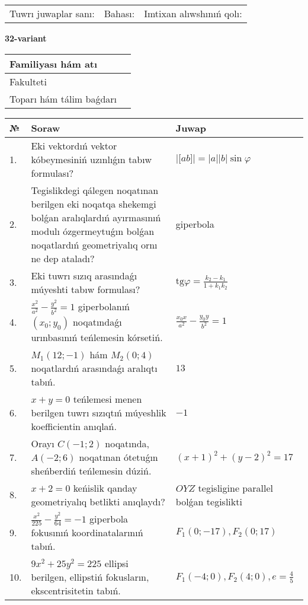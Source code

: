 \documentclass{article}
\begin{document}
\vspace{1cm}

\begin{tabular}{lll}
Tuwrı juwaplar sanı: \underline{\hspace{1.5cm}} & 
Bahası: \underline{\hspace{1.5cm}} & 
Imtixan alıwshınıń qolı: \underline{\hspace{2cm}} \\
\end{tabular}

\egroup

\newpage


\textbf{32-variant}\\

\bgroup
\def\arraystretch{1.6} %

\begin{tabular}{|m{5.7cm}|m{9.5cm}|}
\hline
Familiyası hám atı & \\
\hline
Fakulteti  & \\
\hline
Toparı hám tálim baǵdarı  & \\
\hline
\end{tabular}

\vspace{1cm}

\begin{tabular}{|m{0.7cm}|m{10cm}|m{4cm}|}
\hline
№ & Soraw & Juwap \\
\hline
1. & Eki vektordıń vektor kóbeymesiniń uzınlıǵın tabıw formulası? & $\left| \lbrack ab\rbrack \right|=|a||b|\sin\varphi$ \\
\hline
2. & Tegislikdegi qálegen noqatınan berilgen eki noqatqa shekemgi bolǵan aralıqlardıń ayırmasınıń modulı ózgermeytuǵın bolǵan noqatlardıń geometriyalıq ornı ne dep ataladı? & giperbola \\
\hline
3. & Eki tuwrı sızıq arasındaǵı múyeshti tabıw formulası? & $\text{tg}\varphi=\frac{k_2-k_1}{1+k_1k_2}$ \\
\hline
4. & $\frac{x^2}{a^2}-\frac{y^2}{b^2}=1$ giperbolanıń $(x_0;y_0)$ noqatındaǵı urınbasınıń teńlemesin kórsetiń. & $\frac{x_0x}{a^2}-\frac{y_0y}{b^2}=1$ \\
\hline
5. & $M_{1} (12;-1)$ hám $M_{2} (0;4)$ noqatlardıń arasındaǵı aralıqtı tabıń. & $13$ \\
\hline
6. & $x+y=0$ teńlemesi menen berilgen tuwrı sızıqtıń múyeshlik koefficientin anıqlań. & $- 1$ \\
\hline
7. & Orayı $C (-1;2)$ noqatında, $A (-2;6 )$ noqatınan ótetuǵın sheńberdiń teńlemesin dúziń. & $(x+1)^{2}+(y-2)^{2}=17$ \\
\hline
8. & $x+2=0$ keńislik qanday geometriyalıq betlikti anıqlaydı? &  $OYZ$ tegisligine parallel bolǵan tegislikti \\
\hline
9. & $\frac{x^{2}}{225}-\frac{y^{2}}{64}=-1$ giperbola fokusınıń koordinatalarınıń tabıń. & $F_{1}(0;-17), F_{2}(0;17)$ \\
\hline
10. & $9x^{2}+25y^{2}=225$ ellipsi berilgen, ellipstiń fokusların, ekscentrisitetin tabıń. & $F_1\left(-4;0 \right) , F_2\left( 4;0 \right) , e = \frac{4}{5}$ \\
\hline
\end{tabular}
\end{document}
